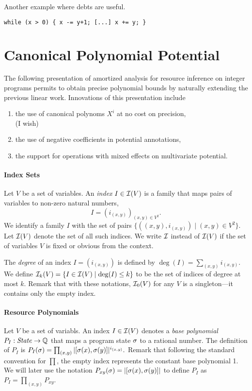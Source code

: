 \documentclass[nocopyrightspace,preprint]{sigplanconf-pldi15}
\begin{document}
Another example where debts are useful.
\begin{lstlisting}
while (x > 0) { x -= y+1; [...] x += y; }
\end{lstlisting}

\section{Canonical Polynomial Potential}

The following presentation of amortized analysis for resource
inference on integer programs permits to obtain precise polynomial
bounds by naturally extending the previous linear work. Innovations
of this presentation include
\begin{enumerate}
\item the use of canonical polynoms $X^i$ at no cost on precision,
 \\ (I wish)
\item the use of negative coefficients in potential annotations,
\item the support for operations with mixed effects on multivariate potential.
\end{enumerate}

\paragraph{Index Sets}

Let $V$ be a set of variables.  An \emph{index} $I \in \mathcal{I}(V)$ is a
family that maps pairs of variables to non-zero natural numbers,
$$
I = (i_{(x,y)})_{(x,y) \in V^2} .
$$
%
We identify a family $I$ with the set of pairs $\{ ((x,y),i_{(x,y)})
\mid (x,y) \in V^2\}$.
Let $\mathcal{I}(V)$ denote the set of all such indices.  We write $\mathcal{I}$
instead of $\mathcal{I}(V)$ if the set of variables $V$ is fixed or obvious
from the context.
%

The \emph{degree} of an index $I = (i_{(x,y)})$
is defined by
$
\deg(I) = \sum_{(x,y)} i_{(x,y)}.
$
We define $\mathcal{I}_k(V) = \{ I \in \mathcal{I}(V) \mid \deg(I) \leq k
\}$ to be the set of indices of degree at most $k$.  Remark
that with these notations, $\mathcal{I}_0(V)$ for any $V$ is a
singleton---it contains only the empty index.

\paragraph{Resource Polynomials}

Let $V$ be a set of variabls.  An index $I \in \mathcal{I}(V)$ denotes a
\emph{base polynomial} $P_I : \mathit{State} \to \mathbb{Q}$ that maps a program
state $\sigma$ to a rational number.  The definition of $P_I$ is
$
P_I(\sigma) = \prod_{(x,y)} |[\sigma(x),\sigma(y)]|^{i_{(x,y)}}.
$
Remark that following the standard convention for $\prod$, the
empty index represents the constant base polynomial 1.  We will
later use the notation $P_{xy}(\sigma) = |[\sigma(x),\sigma(y)]|$
to define $P_I$ as $P_I = \prod_{(x,y)} P_{xy}$.
\end{document}
